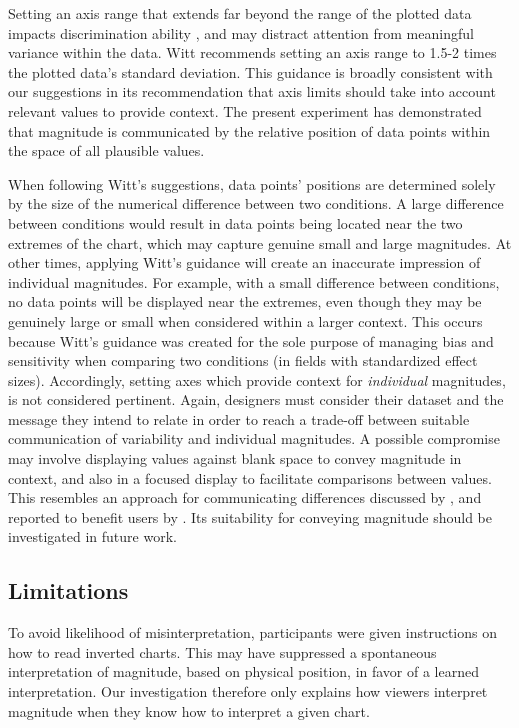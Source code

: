 \documentclass[journal]{vgtc}                %
\begin{document}
Setting an axis range that extends far beyond the range of the plotted
data impacts discrimination ability \citep{witt_graph_2019}, and may distract
attention from meaningful variance within the data. Witt recommends
setting an axis range to 1.5-2 times the plotted data's standard
deviation. This guidance is broadly consistent with our suggestions in
its recommendation that axis limits should take into account relevant
values to provide context. The present experiment has demonstrated that
magnitude is communicated by the relative position of data points within
the space of all plausible values.

When following Witt's \citep{witt_graph_2019} suggestions, data points'
positions are determined solely by the size of the numerical difference
between two conditions. A large difference between conditions would
result in data points being located near the two extremes of the chart,
which may capture genuine small and large magnitudes. At other times,
applying Witt's guidance will create an inaccurate impression of
individual magnitudes. For example, with a small difference between
conditions, no data points will be displayed near the extremes, even
though they may be genuinely large or small when considered within a
larger context. This occurs because Witt's guidance was created for the
sole purpose of managing bias and sensitivity when comparing two
conditions (in fields with standardized effect sizes). Accordingly,
setting axes which provide context for \emph{individual} magnitudes, is not
considered pertinent. Again, designers must consider their dataset and
the message they intend to relate in order to reach a trade-off between
suitable communication of variability and individual magnitudes. A
possible compromise may involve displaying values against blank space to
convey magnitude in context, and also in a focused display to facilitate
comparisons between values. This resembles an approach for communicating
differences discussed by \citet{correll_truncating_2020}, and reported to
benefit users by \citet{ritchie_lie_2019}. Its suitability for conveying
magnitude should be investigated in future work.

\hypertarget{limitations}{%
\subsection{Limitations}\label{limitations}}

To avoid likelihood of misinterpretation, participants were given
instructions on how to read inverted charts. This may have suppressed a
spontaneous interpretation of magnitude, based on physical position, in
favor of a learned interpretation. Our investigation therefore only
explains how viewers interpret magnitude when they know how to interpret
a given chart.
\end{document}
